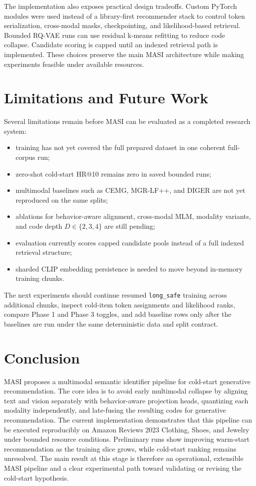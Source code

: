 \documentclass[conference]{IEEEtran}
\begin{document}
The implementation also exposes practical design tradeoffs. Custom PyTorch modules were used instead of a library-first recommender stack to control token serialization, cross-modal masks, checkpointing, and likelihood-based retrieval. Bounded RQ-VAE runs can use residual k-means refitting to reduce code collapse. Candidate scoring is capped until an indexed retrieval path is implemented. These choices preserve the main MASI architecture while making experiments feasible under available resources.

\section{Limitations and Future Work}
Several limitations remain before MASI can be evaluated as a completed research system:
\begin{itemize}
    \item training has not yet covered the full prepared dataset in one coherent full-corpus run;
    \item zero-shot cold-start HR@10 remains zero in saved bounded runs;
    \item multimodal baselines such as CEMG, MGR-LF++, and DIGER are not yet reproduced on the same splits;
    \item ablations for behavior-aware alignment, cross-modal MLM, modality variants, and code depth $D \in \{2,3,4\}$ are still pending;
    \item evaluation currently scores capped candidate pools instead of a full indexed retrieval structure;
    \item sharded CLIP embedding persistence is needed to move beyond in-memory training chunks.
\end{itemize}

The next experiments should continue resumed \texttt{long\_safe} training across additional chunks, inspect cold-item token assignments and likelihood ranks, compare Phase 1 and Phase 3 toggles, and add baseline rows only after the baselines are run under the same deterministic data and split contract.

\section{Conclusion}
MASI proposes a multimodal semantic identifier pipeline for cold-start generative recommendation. The core idea is to avoid early multimodal collapse by aligning text and vision separately with behavior-aware projection heads, quantizing each modality independently, and late-fusing the resulting codes for generative recommendation. The current implementation demonstrates that this pipeline can be executed reproducibly on Amazon Reviews 2023 Clothing, Shoes, and Jewelry under bounded resource conditions. Preliminary runs show improving warm-start recommendation as the training slice grows, while cold-start ranking remains unresolved. The main result at this stage is therefore an operational, extensible MASI pipeline and a clear experimental path toward validating or revising the cold-start hypothesis.
\end{document}
